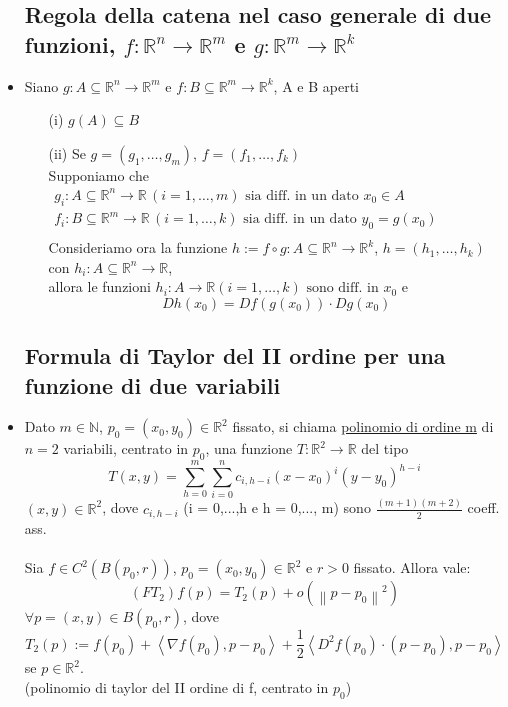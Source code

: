 \documentclass{report}
\newcommand{\Ins}[1]{\mathbb{#1}}
\newcommand{\R}{\Ins{R}}
\newcommand{\tuple}[1]{\left\langle #1 \right\rangle}
\newcommand{\norma}[1]{\left\lVert#1\right\rVert}
\begin{document}
\begin{itemize}
    \subsection{Regola della catena nel caso generale di due funzioni, $f:\R^n \to \R^m$ e $g:\R^m\to\R^k$}
    \item Siano $g: A \subseteq \R^n\to \R^m$ e $f : B \subseteq \R^m \to \R^k$, A e B aperti
          \begin{enumerate}
            \item[(i)] $g(A) \subseteq B$
            \item[(ii)] Se $g = (g_1, \dots, g_m)$, $f = (f_1, \dots, f_k)$ \\
                      Supponiamo che  $\begin{array}{l}
                        g_i : A \subseteq \R^n \to \R \, (i = 1,\dots,m) \text{ sia diff. in un dato } x_0 \in A \\
                        f_i : B \subseteq \R^m \to \R \, (i = 1,\dots,k) \text{ sia diff. in un dato } y_0 = g(x_0) \\ 
                      \end{array}$ \\
                      Consideriamo ora la funzione $h:= f \circ g : A \subseteq \R^n \to \R^k$, $h = (h_1, \dots, h_k)$
                      con $h_i : A \subseteq \R^n \to \R$, \\ allora le funzioni 
                      $h_i : A \to \R (i = 1,\dots,k) \text{ sono diff. in } x_0$ e 
                      $$D h(x_0) = D f(g(x_0)) \cdot D g(x_0)$$
          \end{enumerate}

    \subsection{Formula di Taylor del II ordine per una funzione di due variabili}
    \item Dato $m \in \Ins{N}$, $p_0 = (x_0,y_0) \in \R^2$ fissato, si chiama \underline{polinomio di ordine m} di $n=2$ variabili,
          centrato in $p_0$, una funzione $T: \R^2 \to \R$ del tipo
          $$T(x,y) = \sum_{h=0}^{m} \sum_{i = 0}^n c_{i,h-i} (x-x_0)^i(y-y_0)^{h-i}$$
          $(x,y)\in \R^2$, dove $c_{i,h-i}$ (i = 0,...,h e h = 0,..., m) sono $\frac{(m+1)(m+2)}{2}$ coeff. ass. \\\\
          Sia $f \in C^2\left(B(p_0,r)\right)$, $p_0 = (x_0,y_0) \in \R^2$ e $r > 0$ fissato. Allora vale:
          $$\left(FT_2\right) f(p) = T_2(p) + o\left(\norma{p-p_0}^2\right)$$
          $\forall p = (x,y) \in B(p_0,r)$, dove 
          $$T_2(p) := f(p_0) + \tuple{\nabla f(p_0), p-p_0} + \frac{1}{2} \tuple{D^2f(p_0) \cdot (p-p_0), p-p_0}$$
          se $p \in \R^2$. \\
          (polinomio di taylor del II ordine di f, centrato in $p_0$) 


\end{itemize}
\end{document}

